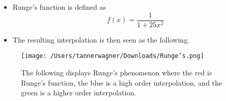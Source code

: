 \documentclass{article}
\begin{document}
\begin{itemize}
\item Runge's function is defined as 
\[
f(x) = \frac{1}{1 + 25x^2}
\]
\item The resulting interpolation is then seen as the following.
\end{itemize}
\begin{figure}[H]
\centering
\texttt{[image: /Users/tannerwagner/Downloads/Runge's.png]}
\caption[Short caption]{The following displays Runge's phenomenon where the red is Runge's function, the blue is a high order interpolation, and the green is a higher order interpolation.}
\label{fig:runge}
\end{figure}
\end{document}
